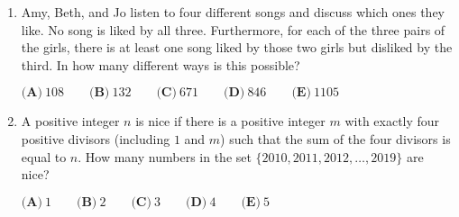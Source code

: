\documentclass{article}%
\begin{document}
\begin{enumerate}
%
\item%
Amy, Beth, and Jo listen to four different songs and discuss which ones they like. No song is liked by all three. Furthermore, for each of the three pairs of the girls, there is at least one song liked by those two girls but disliked by the third. In how many different ways is this possible?

$\textbf{(A)}\ 108\qquad\textbf{(B)}\ 132\qquad\textbf{(C)}\ 671\qquad\textbf{(D)}\ 846\qquad\textbf{(E)}\ 1105$

%
\item%
A positive integer $n$ is nice if there is a positive integer $m$ with exactly four positive divisors (including $1$ and $m$) such that the sum of the four divisors is equal to $n$. How many numbers in the set $\{ 2010,2011,2012,\dotsc,2019 \}$ are nice?


$\textbf{(A)}\ 1 \qquad\textbf{(B)}\ 2 \qquad\textbf{(C)}\ 3 \qquad\textbf{(D)}\ 4 \qquad\textbf{(E)}\ 5$

%
\end{enumerate}

%
\end{document}
